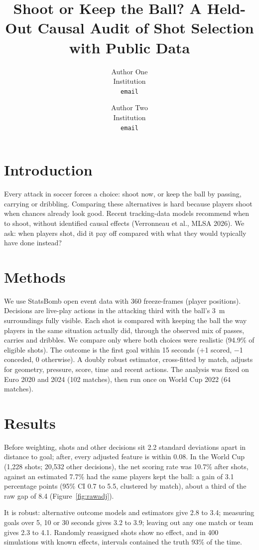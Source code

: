 \documentclass[11pt]{article}
\title{\vspace{-1.5cm}\textbf{Shoot or Keep the Ball? A Held-Out Causal Audit of Shot Selection with Public Data}}
\author{}
\author{%
    Author One \\ {\small Institution} \\ {\small\texttt{email}} \and
    Author Two \\ {\small Institution} \\ {\small\texttt{email}}%
  }
\date{}
\begin{document}
\maketitle
\vspace{-1.2cm}

\section*{Introduction}
Every attack in soccer forces a choice: shoot now, or keep the ball by passing, carrying or
dribbling. Comparing these alternatives is hard because players shoot when chances already
look good. Recent tracking-data models recommend when to shoot, without identified causal
effects (Verronneau et al., MLSA 2026). We ask: when players shot, did it pay off compared
with what they would typically have done instead?


\section*{Methods}
We use StatsBomb open event data with 360 freeze-frames (player positions). Decisions are
live-play actions in the attacking third with the ball's 3~m surroundings fully visible.
Each shot is compared with keeping the ball the way players in the same situation actually
did, through the observed mix of passes, carries and dribbles. We compare only where both
choices were realistic (94.9\% of eligible shots). The outcome is the first goal within 15
seconds ($+$1 scored, $-$1 conceded, 0 otherwise). A doubly robust estimator, cross-fitted
by match, adjusts for geometry, pressure, score, time and recent actions. The analysis was
fixed on Euro 2020 and 2024 (102 matches), then run once on World Cup 2022 (64 matches).


\section*{Results}
Before weighting, shots and other decisions sit 2.2 standard deviations apart in distance to
goal; after, every adjusted feature is within 0.08. In the World Cup (1,228 shots; 20,532
other decisions), the net scoring rate was 10.7\% after shots, against an estimated 7.7\%
had the same players kept the ball: a gain of 3.1 percentage points (95\% CI 0.7 to 5.5,
clustered by match), about a third of the raw gap of 8.4 (Figure~\ref{fig:rawadj}).

It is robust: alternative outcome models and estimators give 2.8 to 3.4; measuring goals
over 5, 10 or 30 seconds gives 3.2 to 3.9; leaving out any one match or team gives 2.3 to
4.1. Randomly reassigned shots show no effect, and in 400 simulations with known effects,
intervals contained the truth 93\% of the time.
\end{document}
